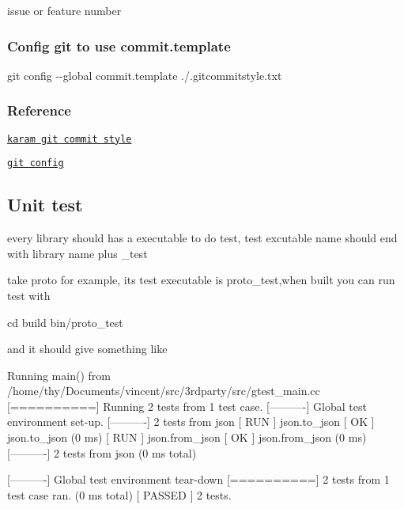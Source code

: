 issue or feature number

\subsubsection*{Config git to use {\ttfamily commit.\+template}}

{\ttfamily git config -\/-\/global commit.\+template ./.gitcommitstyle.\+txt}

\subsubsection*{Reference}


\begin{DoxyItemize}
\item \href{http://karma-runner.github.io/4.0/dev/git-commit-msg.html}{\tt karam git commit style}
\item \href{https://git-scm.com/book/en/v2/Customizing-Git-Git-Configuration}{\tt git config}
\end{DoxyItemize}

\subsection*{Unit test}

every library should has a executable to do test, test excutable name should end with library name plus {\ttfamily \+\_\+test}

take {\ttfamily proto} for example, its test executable is {\ttfamily proto\+\_\+test},when built you can run test with


\begin{DoxyCode}
cd build
bin/proto\_test
\end{DoxyCode}


and it should give something like


\begin{DoxyCode}
Running main() from /home/thy/Documents/vincent/src/3rdparty/src/gtest\_main.cc
[==========] Running 2 tests from 1 test case.
[----------] Global test environment set-up.
[----------] 2 tests from json
[ RUN      ] json.to\_json
[       OK ] json.to\_json (0 ms)
[ RUN      ] json.from\_json
[       OK ] json.from\_json (0 ms)
[----------] 2 tests from json (0 ms total)

[----------] Global test environment tear-down
[==========] 2 tests from 1 test case ran. (0 ms total)
[  PASSED  ] 2 tests.
\end{DoxyCode}


